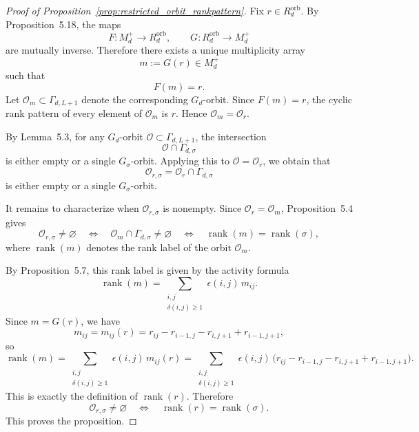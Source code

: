 \documentclass{article}
\theoremstyle{definition}
\begin{document}
\begin{proof}[Proof of Proposition~\ref{prop:restricted_orbit_rankpattern}]\label{proof:restricted_orbit_rankpattern}
Fix \(r\in R_d^{\mathrm{orb}}\). By Proposition~5.18, the maps
\[
F:M_d^+\to R_d^{\mathrm{orb}},
\qquad
G:R_d^{\mathrm{orb}}\to M_d^+
\]
are mutually inverse. Therefore there exists a unique multiplicity array
\[
m:=G(r)\in M_d^+
\]
such that
\[
F(m)=r.
\]
Let \(\mathcal O_m\subset \Gamma_{d,L+1}\) denote the corresponding \(G_d\)-orbit. Since \(F(m)=r\),
the cyclic rank pattern of every element of \(\mathcal O_m\) is \(r\). Hence \(\mathcal O_m=\mathcal O_r\).

By Lemma~5.3, for any \(G_d\)-orbit \(\mathcal O\subset \Gamma_{d,L+1}\), the intersection
\[
\mathcal O\cap \Gamma_{d,\sigma}
\]
is either empty or a single \(G_\sigma\)-orbit. Applying this to \(\mathcal O=\mathcal O_r\), we obtain that
\[
\mathcal O_{r,\sigma}=\mathcal O_r\cap \Gamma_{d,\sigma}
\]
is either empty or a single \(G_\sigma\)-orbit.

It remains to characterize when \(\mathcal O_{r,\sigma}\) is nonempty. Since \(\mathcal O_r=\mathcal O_m\),
Proposition~5.4 gives
\[
\mathcal O_{r,\sigma}\neq\varnothing
\quad\Longleftrightarrow\quad
\mathcal O_m\cap \Gamma_{d,\sigma}\neq\varnothing
\quad\Longleftrightarrow\quad
\operatorname{rank}(m)=\operatorname{rank}(\sigma),
\]
where \(\operatorname{rank}(m)\) denotes the rank label of the orbit \(\mathcal O_m\).

By Proposition~5.7, this rank label is given by the activity formula
\[
\operatorname{rank}(m)
=
\sum_{\substack{i,j\\ \delta(i,j)\ge 1}} \epsilon(i,j)\,m_{ij}.
\]
Since \(m=G(r)\), we have
\[
m_{ij}=m_{ij}(r)=r_{ij}-r_{i-1,j}-r_{i,j+1}+r_{i-1,j+1},
\]
so
\[
\operatorname{rank}(m)
=
\sum_{\substack{i,j\\ \delta(i,j)\ge 1}}
\epsilon(i,j)\,m_{ij}(r)
=
\sum_{\substack{i,j\\ \delta(i,j)\ge 1}}
\epsilon(i,j)\,\bigl(r_{ij}-r_{i-1,j}-r_{i,j+1}+r_{i-1,j+1}\bigr).
\]
This is exactly the definition of \(\operatorname{rank}(r)\). Therefore
\[
\mathcal O_{r,\sigma}\neq\varnothing
\quad\Longleftrightarrow\quad
\operatorname{rank}(r)=\operatorname{rank}(\sigma).
\]
This proves the proposition.
\end{proof}
\end{document}
